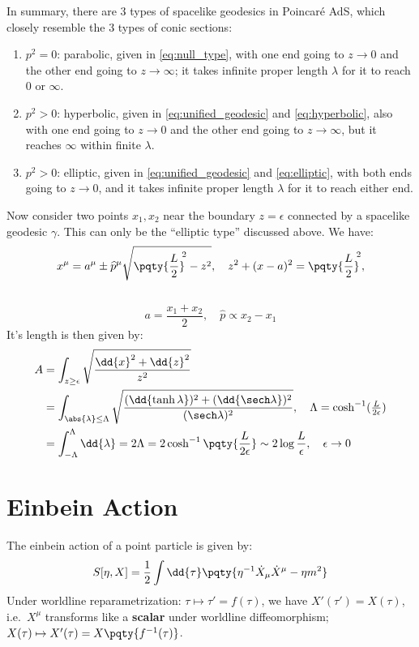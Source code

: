 \documentclass[a4paper,10pt]{article}
\begin{document}
	In summary, there are 3 types of spacelike geodesics in Poincar\'e AdS, which closely resemble the 3 types of conic sections:
	\begin{enumerate}
	\item $p^2 = 0$: parabolic, given in \eqref{eq:null_type}, with one end going to $z\to 0$ and the other end going to $z\to\infty$; it takes infinite proper length $\lambda$ for it to reach $0$ or $\infty$. 
	\item $p^2 > 0$: hyperbolic, given in \eqref{eq:unified_geodesic} and \eqref{eq:hyperbolic}, also with one end going to $z\to 0$ and the other end going to $z\to\infty$, but it reaches $\infty$ within finite $\lambda$. 
	\item $p^2 > 0$: elliptic, given in \eqref{eq:unified_geodesic} and \eqref{eq:elliptic}, with both ends going to $z\to 0$, and it takes infinite proper length $\lambda$ for it to reach either end. 
	\end{enumerate}
	
	Now consider two points $x_1,x_2$ near the boundary $z = \epsilon$ connected by a spacelike geodesic $\gamma$. This can only be the ``elliptic type'' discussed above. We have:
	\begin{equation}
		x^\mu
		= a^\mu \pm \widehat{p}^\mu
			\sqrt{\pqty{\frac{L}{2}}^{\!\!2} - z^2},
	\quad
		z^2 + (x - a)^2
		= \pqty{\frac{L}{2}}^{\!\!2},
	\end{equation}
	\\[-1.5\baselineskip]
	\begin{equation}
		a = \frac{x_1 + x_2}{2},
	\quad
		\widehat{p} \propto x_2 - x_1
	\end{equation}
	It's length is then given by:
	\begin{equation}
	\begin{aligned}
		A
		&= \int_{z\ge\epsilon}
			\sqrt{\frac{\dd{x}^2 + \dd{z}^2}{z^2}} \\
		&= \int_{\abs{\lambda} \le \Lambda} \sqrt{
			\frac{
				(\dd{\tanh\lambda})^2
				+ (\dd{\sech\lambda})^2
			}{(\sech\lambda)^2}
		},
		\quad \Lambda
			= \cosh^{-1} (\tfrac{L}{2\epsilon}) \\
		&= \int_{-\Lambda}^{\Lambda}
			\dd{\lambda}
		= 2\Lambda
		= 2\cosh^{-1} \pqty{\frac{L}{2\epsilon}}
		\sim 2\log \frac{L}{\epsilon},
	\quad \epsilon \to 0
	\end{aligned}
	\end{equation}

\section{Einbein Action}
	The einbein action of a point particle is given by:
	\begin{equation}
		S[\eta,X] = \frac{1}{2} \int \dd{\tau} \pqty{
				\eta^{-1} \dot{X}_\mu \dot{X}^\mu
				- \eta m^2
			}
	\end{equation}
	Under worldline reparametrization: $\tau \mapsto \tau' = f(\tau)$, we have $X'(\tau') = X(\tau)$, i.e.~$X^\mu$ transforms like a \textbf{scalar} under worldline diffeomorphism; $
		X(\tau)
		\mapsto X'(\tau)
		= X\pqty{f^{-1}(\tau)}
	$. 
	
\end{document}
